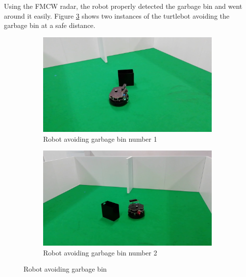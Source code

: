 Using the \ac{FMCW} radar, the robot properly detected the garbage bin and went around it easily.
 Figure \ref{fig:garbageRS} shows two instances of the turtlebot avoiding the garbage bin at a safe distance.
\begin{figure}[ht!]
  \centering
  \begin{subfigure}[b]{0.49\linewidth}
    \includegraphics[width=\linewidth]{imgs/chapter5/garbageRS.png}
     \caption{Robot avoiding garbage bin number 1}
     \label{fig::garbageRS1}
  \end{subfigure}
  \begin{subfigure}[b]{0.49\linewidth}
    \includegraphics[width=\linewidth]{imgs/chapter5/garbageRS2.png}
    \caption{Robot avoiding garbage bin  number 2}
    \label{fig::garbageRS2}
  \end{subfigure}
  \caption{Robot avoiding garbage bin}
  \label{fig:garbageRS}
\end{figure}

